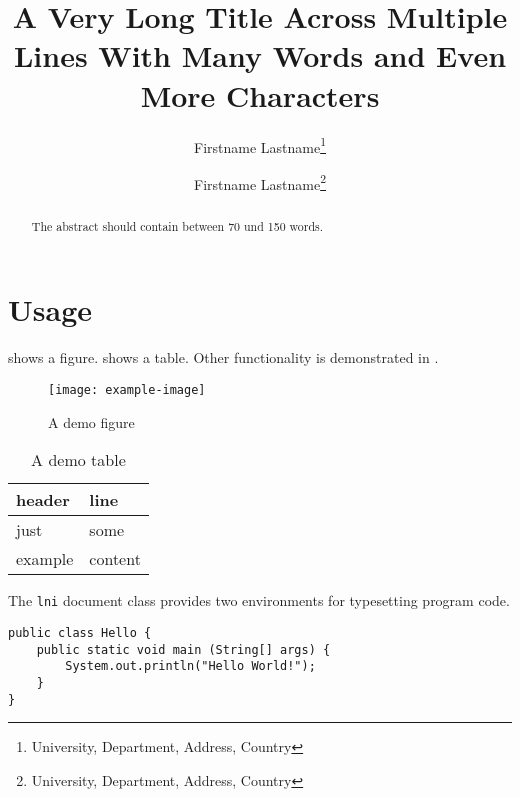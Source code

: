\documentclass[english,utf8,biblatex]{lni}
\begin{document}
\title[Short Title]{A Very Long Title Across Multiple Lines With Many Words and Even More Characters}
\author[Firstname Lastname \and Firstname Lastname]{%
  Firstname Lastname\footnote{University, Department, Address, Country } \and
  Firstname Lastname\footnote{University, Department, Address, Country }
}
\maketitle

\begin{abstract}
The abstract should contain between 70 und 150 words.
\end{abstract}


\section{Usage}
 shows a figure.  shows a table. Other functionality is demonstrated in .

\begin{figure}
  \centering
  \texttt{[image: example-image]}
  \caption{A demo figure}
  \label{fig:demo}
\end{figure}

\begin{table}
  \centering
  \begin{tabular}{ll}
    \toprule
    header & line \\
    \midrule
    just & some \\
    example & content \\
    \bottomrule
  \end{tabular}
  \caption{A demo table}
  \label{tab:demo}
\end{table}

The \texttt{lni} document class provides two environments for typesetting program code.

\begin{verbatim}
public class Hello {
    public static void main (String[] args) {
        System.out.println("Hello World!");
    }
}
\end{verbatim}
\end{document}

